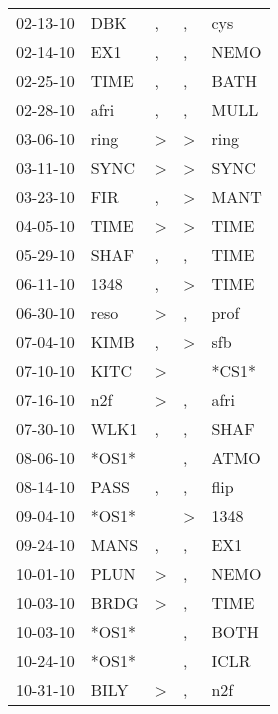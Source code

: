 \begin{supertabular}{lllll}
 02-13-10 &    DBK &                , &                , &    cys \\
 02-14-10 &    EX1 &                , &                , &   NEMO \\
 02-25-10 &   TIME &                , &                , &   BATH \\
 02-28-10 &   afri &                , &                , &   MULL \\
 03-06-10 &   ring &     \textgreater &     \textgreater &   ring \\
 03-11-10 &   SYNC &     \textgreater &     \textgreater &   SYNC \\
 03-23-10 &    FIR &                , &     \textgreater &   MANT \\
 04-05-10 &   TIME &     \textgreater &     \textgreater &   TIME \\
 05-29-10 &   SHAF &                , &                , &   TIME \\
 06-11-10 &   1348 &                , &     \textgreater &   TIME \\
 06-30-10 &   reso &     \textgreater &                , &   prof \\
 07-04-10 &   KIMB &                , &     \textgreater &    sfb \\
 07-10-10 &   KITC &     \textgreater &                  &  *CS1* \\
 07-16-10 &    n2f &     \textgreater &                , &   afri \\
 07-30-10 &   WLK1 &                , &                , &   SHAF \\
 08-06-10 &  *OS1* &                  &                , &   ATMO \\
 08-14-10 &   PASS &                , &                , &   flip \\
 09-04-10 &  *OS1* &                  &     \textgreater &   1348 \\
 09-24-10 &   MANS &                , &                , &    EX1 \\
 10-01-10 &   PLUN &     \textgreater &                , &   NEMO \\
 10-03-10 &   BRDG &     \textgreater &                , &   TIME \\
 10-03-10 &  *OS1* &                  &                , &   BOTH \\
 10-24-10 &  *OS1* &                  &                , &   ICLR \\
 10-31-10 &   BILY &     \textgreater &                , &    n2f \\

\end{supertabular}
